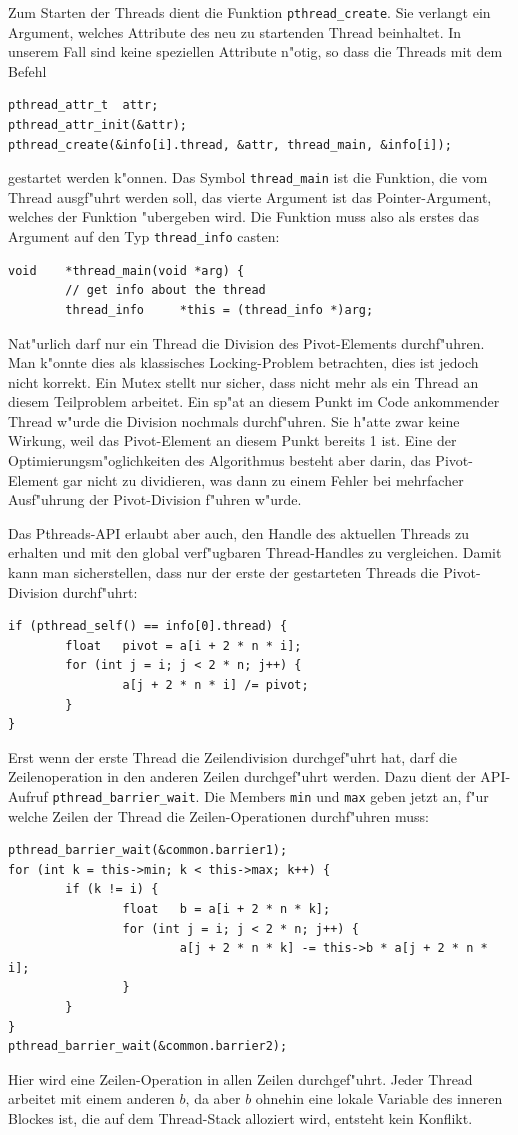 Zum Starten der Threads dient die Funktion \verb+pthread_create+.
Sie verlangt ein Argument, welches Attribute des neu zu startenden
Thread beinhaltet. In unserem Fall sind keine speziellen Attribute
n"otig, so dass die Threads mit dem Befehl
\begin{verbatim}
pthread_attr_t  attr;
pthread_attr_init(&attr);
pthread_create(&info[i].thread, &attr, thread_main, &info[i]);
\end{verbatim}
gestartet werden k"onnen.
Das Symbol \verb+thread_main+ ist die Funktion, die vom Thread
ausgf"uhrt werden soll, das vierte Argument ist das Pointer-Argument,
welches der Funktion "ubergeben wird.
Die Funktion muss also als erstes das Argument auf den Typ \verb+thread_info+
casten:
\begin{verbatim}
void    *thread_main(void *arg) {
        // get info about the thread
        thread_info     *this = (thread_info *)arg;
\end{verbatim}
Nat"urlich darf nur ein Thread die Division des Pivot-Elements durchf"uhren.
Man k"onnte dies als klassisches Locking-Problem betrachten, dies ist
jedoch nicht korrekt. Ein Mutex stellt nur sicher, dass nicht mehr als
ein Thread an diesem Teilproblem arbeitet. Ein sp"at an diesem Punkt
im Code ankommender Thread w"urde die Division nochmals durchf"uhren.
Sie h"atte zwar keine Wirkung, weil das Pivot-Element an diesem Punkt
bereits 1 ist. Eine der Optimierungsm"oglichkeiten des Algorithmus
besteht aber darin, das Pivot-Element gar nicht zu dividieren, was
dann zu einem Fehler bei mehrfacher Ausf"uhrung der Pivot-Division
f"uhren w"urde.

Das Pthreads-API erlaubt aber auch, den Handle des aktuellen Threads
zu erhalten und mit den global verf"ugbaren Thread-Handles zu
vergleichen. Damit kann man sicherstellen, dass nur der erste der
gestarteten Threads die Pivot-Division durchf"uhrt:
\begin{verbatim}
if (pthread_self() == info[0].thread) {
        float   pivot = a[i + 2 * n * i];
        for (int j = i; j < 2 * n; j++) {
                a[j + 2 * n * i] /= pivot;
        }
}
\end{verbatim}

Erst wenn der erste Thread die Zeilendivision durchgef"uhrt hat, darf 
die Zeilenoperation in den anderen Zeilen durchgef"uhrt werden. Dazu
dient der API-Aufruf \verb+pthread_barrier_wait+.
Die Members {\tt min} und {\tt max} geben jetzt an, f"ur welche Zeilen
der Thread die Zeilen-Operationen durchf"uhren muss:
\begin{verbatim}
pthread_barrier_wait(&common.barrier1);
for (int k = this->min; k < this->max; k++) {
        if (k != i) {
                float   b = a[i + 2 * n * k];
                for (int j = i; j < 2 * n; j++) {
                        a[j + 2 * n * k] -= this->b * a[j + 2 * n * i];
                }
        }
}
pthread_barrier_wait(&common.barrier2);
\end{verbatim}
Hier wird eine Zeilen-Operation in allen Zeilen durchgef"uhrt.
Jeder Thread arbeitet mit einem anderen $b$, da aber $b$ ohnehin
eine lokale Variable des inneren Blockes ist, die auf dem Thread-Stack
alloziert wird, entsteht kein Konflikt.


